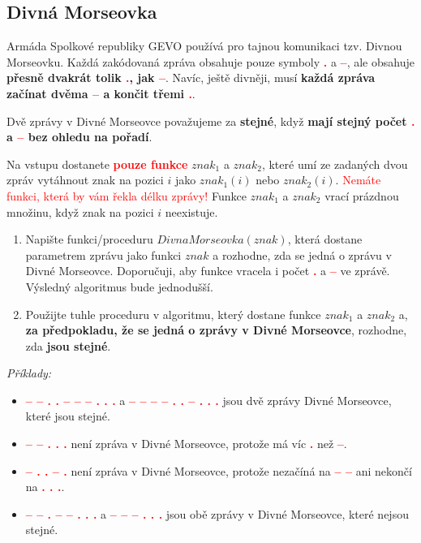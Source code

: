 \documentclass[a4paper,11pt]{article}
\newcommand{\clr}{\textcolor{red}}
\begin{document}
\subsection*{Divná Morseovka}

Armáda Spolkové republiky GEVO používá pro tajnou komunikaci tzv. Divnou
Morseovku. Každá zakódovaná zpráva obsahuje pouze symboly \clr{\textbf{.}} a
\clr{\textbf{--}}, ale obsahuje \textbf{přesně dvakrát tolik \clr{.}, jak
\clr{--}}. Navíc, ještě divněji, musí \textbf{každá zpráva začínat dvěma
\clr{--} a končit třemi \clr{.}}.

Dvě zprávy v Divné Morseovce považujeme za \textbf{stejné}, když \textbf{mají
stejný počet \clr{.} a \clr{--} bez ohledu na pořadí}.

Na vstupu dostanete \clr{\textbf{pouze funkce}} $znak_1$ a $znak_2$, které umí
ze zadaných dvou zpráv vytáhnout znak na pozici $i$ jako $znak_1(i)$ nebo
$znak_2(i)$. \clr{Nemáte funkci, která by vám řekla délku zprávy!} Funkce
$znak_1$ a $znak_2$ vrací prázdnou množinu, když znak na pozici $i$ neexistuje.

\begin{enumerate}
 \item Napište funkci/proceduru $DivnaMorseovka(znak)$, která dostane parametrem
  zprávu jako funkci $znak$ a rozhodne, zda se jedná o zprávu v Divné Morseovce.
  Doporučuji, aby funkce vracela i počet \clr{\textbf{.}} a \clr{\textbf{--}} ve
  zprávě. Výsledný algoritmus bude jednodušší.
 \item Použijte tuhle proceduru v algoritmu, který dostane funkce $znak_1$ a
  $znak_2$ a, \textbf{za předpokladu, že se jedná o zprávy v Divné Morseovce},
  rozhodne, zda \textbf{jsou stejné}.
\end{enumerate}

\emph{Příklady:}
\begin{itemize}
 \item \clr{\textbf{-- -- . . -- -- -- . . .}} a \clr{\textbf{-- -- -- -- . . --
  . . .}} jsou dvě zprávy Divné Morseovce, které jsou stejné.
 \item \clr{\textbf{-- -- . . .}} není zpráva v Divné Morseovce, protože má víc
  \clr{\textbf{.}} než \clr{\textbf{--}}.
 \item \clr{\textbf{-- . . -- .}} není zpráva v Divné Morseovce, protože nezačíná
  na \clr{\textbf{-- --}} ani nekončí na \clr{\textbf{. . .}}.
 \item \clr{\textbf{-- -- . -- -- . . .}} a \clr{\textbf{-- -- -- . . .}} jsou
  obě zprávy v Divné Morseovce, které nejsou stejné.
\end{itemize}
\end{document}
